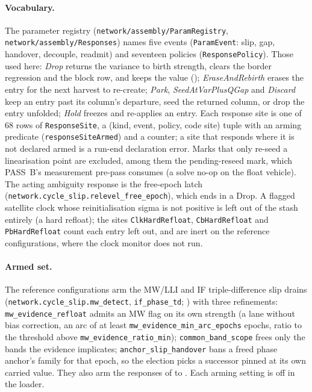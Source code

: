 \documentclass[main.tex]{subfiles}
\begin{document}
\paragraph{Vocabulary.}
The parameter registry (\texttt{network/assembly/ParamRegistry},
\texttt{network/assembly/Responses}) names five events
(\texttt{ParamEvent}: slip, gap, handover, decouple, readmit) and seventeen
policies (\texttt{ResponsePolicy}). Those used here: \emph{Drop} returns
the variance to birth strength, clears the border regression and the block
row, and keeps the value (); \emph{EraseAndRebirth} erases the
entry for the next harvest to re-create; \emph{Park},
\emph{SeedAtVarPlusQGap} and \emph{Discard} keep an entry past its
column's departure, seed the returned column, or drop the entry
unfolded; \emph{Hold} freezes and re-applies an entry. Each response
site is one of 68 rows of \texttt{ResponseSite}, a (kind, event, policy,
code site) tuple with an arming predicate (\texttt{responseSiteArmed})
and a counter; a site that responds where it is not declared armed is a
run-end declaration error. Marks that only re-seed a linearisation point
are excluded, among them the pending-reseed mark, which PASS~B's
measurement pre-pass consumes (a solve no-op on the float vehicle). The
acting ambiguity response is the free-epoch latch
(\texttt{network.cycle\_slip.relevel\_free\_epoch}), which ends in a Drop.
A flagged satellite clock whose reinitialisation sigma is not positive is
left out of the stash entirely (a hard refloat); the sites
\texttt{ClkHardRefloat}, \texttt{CbHardRefloat} and \texttt{PbHardRefloat}
count each entry left out, and are inert on the reference configurations,
where the clock monitor does not run.

\paragraph{Armed set.}
The reference configurations arm the MW/LLI and IF triple-difference slip
drains (\texttt{network.cycle\_slip.mw\_detect}, \texttt{if\_phase\_td};
) with three
refinements: \texttt{mw\_evidence\_refloat} admits an MW flag on its own
strength (a lane without bias correction, an arc of at least
\texttt{mw\_evidence\_min\_arc\_epochs} epochs, ratio to the threshold above
\texttt{mw\_evidence\_ratio\_min}); \texttt{common\_band\_scope} frees
only the bands the evidence implicates; \texttt{anchor\_slip\_handover}
bans a freed phase anchor's family for that epoch, so the election picks
a successor pinned at its own carried value. They also arm the responses
of  to . Each arming
setting is off in the loader.
\end{document}
